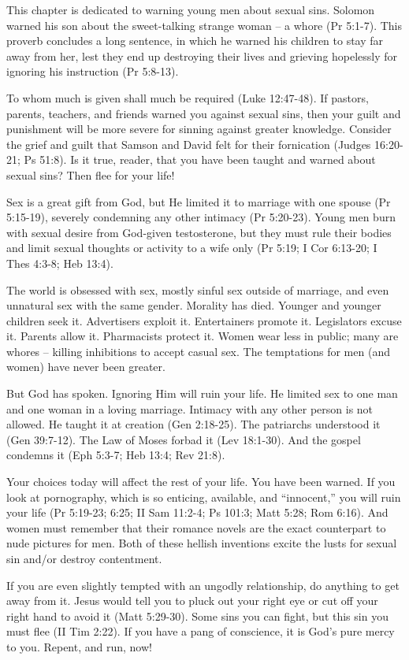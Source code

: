 This chapter is dedicated to warning young men about sexual sins. Solomon warned his son about the sweet-talking strange woman – a whore (Pr 5:1-7). This proverb concludes a long sentence, in which he warned his children to stay far away from her, lest they end up destroying their lives and grieving hopelessly for ignoring his instruction (Pr 5:8-13).

To whom much is given shall much be required (Luke 12:47-48). If pastors, parents, teachers, and friends warned you against sexual sins, then your guilt and punishment will be more severe for sinning against greater knowledge. Consider the grief and guilt that Samson and David felt for their fornication (Judges 16:20-21; Ps 51:8). Is it true, reader, that you have been taught and warned about sexual sins? Then flee for your life!

Sex is a great gift from God, but He limited it to marriage with one spouse (Pr 5:15-19), severely condemning any other intimacy (Pr 5:20-23). Young men burn with sexual desire from God-given testosterone, but they must rule their bodies and limit sexual thoughts or activity to a wife only (Pr 5:19; I Cor 6:13-20; I Thes 4:3-8; Heb 13:4).

The world is obsessed with sex, mostly sinful sex outside of marriage, and even unnatural sex with the same gender. Morality has died. Younger and younger children seek it. Advertisers exploit it. Entertainers promote it. Legislators excuse it. Parents allow it. Pharmacists protect it. Women wear less in public; many are whores – killing inhibitions to accept casual sex. The temptations for men (and women) have never been greater.

But God has spoken. Ignoring Him will ruin your life. He limited sex to one man and one woman in a loving marriage. Intimacy with any other person is not allowed. He taught it at creation (Gen 2:18-25). The patriarchs understood it (Gen 39:7-12). The Law of Moses forbad it (Lev 18:1-30). And the gospel condemns it (Eph 5:3-7; Heb 13:4; Rev 21:8).

Your choices today will affect the rest of your life. You have been warned. If you look at pornography, which is so enticing, available, and “innocent,” you will ruin your life (Pr 5:19-23; 6:25; II Sam 11:2-4; Ps 101:3; Matt 5:28; Rom 6:16). And women must remember that their romance novels are the exact counterpart to nude pictures for men. Both of these hellish inventions excite the lusts for sexual sin and/or destroy contentment.

If you are even slightly tempted with an ungodly relationship, do anything to get away from it. Jesus would tell you to pluck out your right eye or cut off your right hand to avoid it (Matt 5:29-30). Some sins you can fight, but this sin you must flee (II Tim 2:22). If you have a pang of conscience, it is God’s pure mercy to you. Repent, and run, now!

